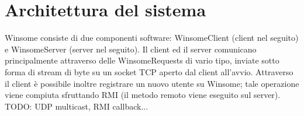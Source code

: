 \section{Architettura del sistema}

Winsome consiste di due componenti software: WinsomeClient (client nel seguito) e WinsomeServer (server nel seguito). Il client ed il server comunicano principalmente attraverso delle WinsomeRequests di vario tipo, inviate sotto forma di stream di byte su un socket TCP aperto dal client all'avvio. Attraverso il client è possibile inoltre registrare un nuovo utente su Winsome; tale operazione viene compiuta sfruttando RMI (il metodo remoto viene eseguito sul server). \\
TODO: UDP multicast, RMI callback...